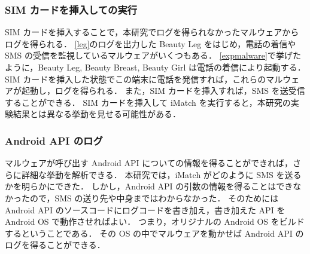 \subsubsection{SIM カードを挿入しての実行}
SIM カードを挿入することで，本研究でログを得られなかったマルウェアからログを得られる．
\ref{leg}のログを出力した Beauty Leg をはじめ，電話の着信や SMS の受信を監視しているマルウェアがいくつもある．
\ref{expmalware}で挙げたように，Beauty Leg, Beauty Breast, Beauty Girl は電話の着信により起動する．
SIM カードを挿入した状態でこの端末に電話を発信すれば，これらのマルウェアが起動し，ログを得られる．
また，SIM カードを挿入すれば，SMS を送受信することができる．
SIM カードを挿入して iMatch を実行すると，本研究の実験結果とは異なる挙動を見せる可能性がある．

\subsubsection{Android API のログ}
マルウェアが呼び出す Android API についての情報を得ることができれば，さらに詳細な挙動を解析できる．
本研究では，iMatch がどのように SMS を送るかを明らかにできた．
しかし，Android API の引数の情報を得ることはできなかったので，SMS の送り先や中身まではわからなかった．
そのためには Android API のソースコードにログコードを書き加え，書き加えた API を Android OS で動作させればよい．
つまり，オリジナルの Android OS をビルドするということである．
その OS の中でマルウェアを動かせば Android API のログを得ることができる．